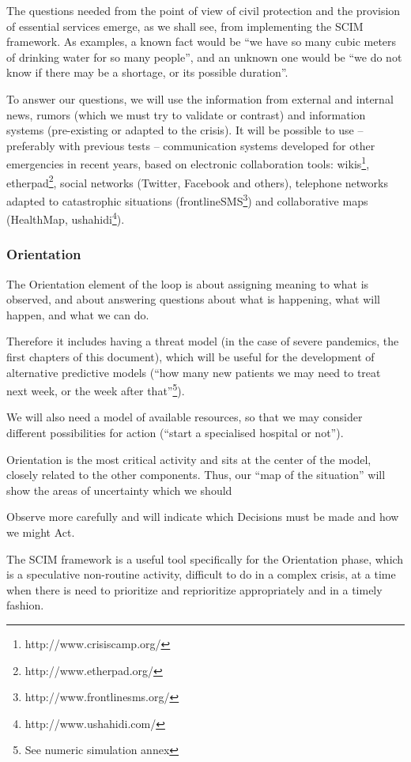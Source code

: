 \documentclass[12pt, a4]{scrartcl}
\begin{document}
The questions needed from the point of view of civil protection and the provision of essential services emerge, as we shall see, from implementing the SCIM framework. As examples, a known fact would be “we have so many cubic meters of drinking water for so many people”, and an unknown one would be “we do not know if there may be a shortage, or its possible duration”.

To answer our questions, we will use the information from external and internal news, rumors (which we must try to validate or contrast) and information systems (pre-existing or adapted to the crisis). It will be possible to use – preferably with previous tests – communication systems developed for other emergencies in recent years, based on electronic collaboration tools: wikis\footnote{http://www.crisiscamp.org/}, etherpad\footnote{http://www.etherpad.org/}, social networks (Twitter, Facebook and others), telephone networks adapted to catastrophic situations (frontlineSMS\footnote{http://www.frontlinesms.org/}) and collaborative maps (HealthMap, ushahidi\footnote{http://www.ushahidi.com/}).

\subsubsection{Orientation}
The Orientation element of the loop is about assigning meaning to what is observed, and about answering questions about what is happening, what will happen, and what we can do.

Therefore it includes having a threat model (in the case of severe pandemics, the first chapters of this document), which will be useful for the development of alternative predictive models (“how many new patients we may need to treat next week, or the week after that”\footnote{See numeric simulation annex}).

We will also need a model of available resources, so that we may consider different possibilities for action (“start a specialised hospital or not”).

Orientation is the most critical activity and sits at the center of the model, closely related to the other components. Thus, our “map of the situation” will show the areas of uncertainty which we should 

Observe more carefully and will indicate which Decisions must be made and how we might Act.

The SCIM framework is a useful tool specifically for the Orientation phase, which is a speculative non-routine activity, difficult to do in a complex crisis, at a time when there is need to prioritize and reprioritize appropriately and in a timely fashion.
\end{document}
